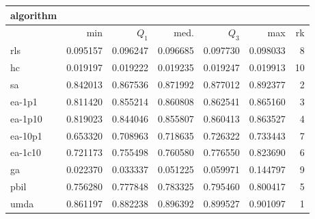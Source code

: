 \begin{tabular}{@{}l*{5}{>{{}}N{1}{3}}>{{}}N{2}{0}@{}}
\toprule
{algorithm} &  \\
\midrule
& {min} & {$Q_1$} & {med.} & {$Q_3$} & {max} & {rk}\\
\midrule
rls & 0.095157 & 0.096247 & 0.096685 & 0.097730 & 0.098033 & 8\\
hc & 0.019197 & 0.019222 & 0.019235 & 0.019247 & 0.019913 & 10\\
sa & 0.842013 & 0.867536 & 0.871992 & 0.877012 & 0.892377 & 2\\
ea-1p1 & 0.811420 & 0.855214 & 0.860808 & 0.862541 & 0.865160 & 3\\
ea-1p10 & 0.819023 & 0.844046 & 0.855807 & 0.860413 & 0.863527 & 4\\
ea-10p1 & 0.653320 & 0.708963 & 0.718635 & 0.726322 & 0.733443 & 7\\
ea-1c10 & 0.721173 & 0.755498 & 0.760580 & 0.776550 & 0.823690 & 6\\
ga & 0.022370 & 0.033337 & 0.051225 & 0.059971 & 0.144797 & 9\\
pbil & 0.756280 & 0.777848 & 0.783325 & 0.795460 & 0.800417 & 5\\
umda & {\color{blue}} 0.861197 & {\color{blue}} 0.882238 & {\color{blue}} 0.896392 & {\color{blue}} 0.899527 & {\color{blue}} 0.901097 & 1\\
\bottomrule
\end{tabular}
